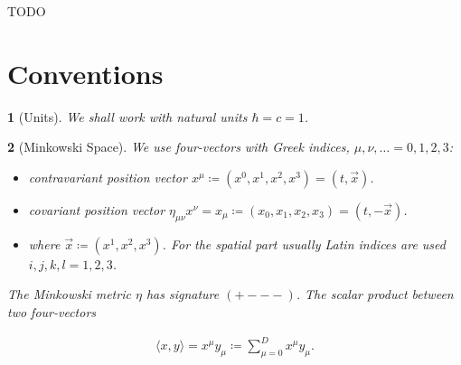 \documentclass{article}
\theoremstyle{plain} %
\theoremstyle{convention} %
\newtheorem*{convention}{} %
\theoremstyle{remark} %
\numberwithin{equation}{section}
\begin{document}
TODO

\section{Conventions}

\begin{convention}[Units]
We shall work with natural units $\hbar = c = 1$.
\end{convention}

\begin{convention}[Minkowski Space]
We use four-vectors with Greek indices, $\mu, \nu, \dots = 0, 1, 2, 3$:
\begin{itemize}
  \item contravariant position vector $x^{\mu} \coloneqq (x^0, x^1, x^2, x^3) = (t, \vec{x})$.
  \item covariant position vector $\eta_{\mu \nu} x^{\nu} = x_{\mu} \coloneqq (x_0, x_1, x_2, x_3) = (t, -\vec{x})$.
  \item where $\vec{x} \coloneqq (x^1, x^2, x^3)$. For the spatial part usually Latin indices are used $i,j,k,l = 1, 2, 3$.
\end{itemize}

The Minkowski metric $\eta$ has signature $(+---)$. The scalar product between two four-vectors

\begin{align*}
  \langle x, y \rangle = x^{\mu} y_{\mu} \coloneqq \sum_{\mu=0}^D x^{\mu} y_{\mu}.
\end{align*}

\end{convention}
\end{document}
